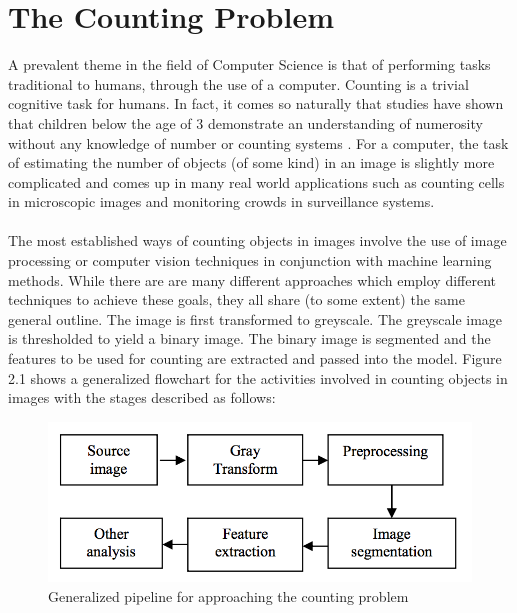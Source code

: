 \section{The Counting Problem}
A prevalent theme in the field of Computer Science is that of performing tasks traditional to humans, through the use of a computer. Counting is a trivial cognitive task for humans. In fact, it comes so naturally that studies have shown that children below the age of 3 demonstrate an understanding of numerosity without any knowledge of number or counting systems \cite{REF1}. For a computer, the task of estimating the number of objects (of some kind) in an image is slightly more complicated and comes up in many real world applications such as counting cells in microscopic images and monitoring crowds in surveillance systems.\\ \\
%
The most established ways of counting objects in images involve the use of image processing or computer vision techniques in conjunction with machine learning methods. While there are are many different approaches which employ different techniques to achieve these goals, they all share (to some extent) the same general outline. The image is first transformed to greyscale. The greyscale image is thresholded to yield a binary image. The binary image is segmented and the features to be used for counting are extracted and passed into the model. Figure 2.1 shows a generalized flowchart for the activities involved in counting objects in images with the stages described as follows:\\
\begin{figure}[ht!]
\centering
\includegraphics[scale=0.5]{Images/general_pipeline}
\caption{Generalized pipeline for approaching the counting problem}
\label{fig:columnfigure}
\end{figure}

